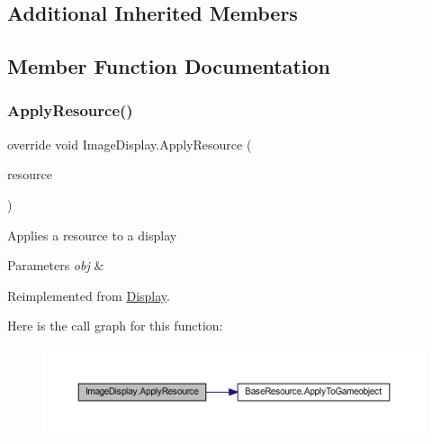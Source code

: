 \subsection*{Additional Inherited Members}


\subsection{Member Function Documentation}
\mbox{\label{class_image_display_ab4cae8c66db7e7d77ab117fe24e63980}} 
\subsubsection{\texorpdfstring{Apply\+Resource()}{ApplyResource()}}
{\footnotesize\ttfamily override void Image\+Display.\+Apply\+Resource (\begin{DoxyParamCaption}\item[{\mbox{\hyperlink{class_base_display_resource}{Base\+Display\+Resource}}}]{resource }\end{DoxyParamCaption})\hspace{0.3cm}{\ttfamily [virtual]}}



Applies a resource to a display 


\begin{DoxyParams}{Parameters}
{\em obj} & \\
\hline
\end{DoxyParams}


Reimplemented from \mbox{\hyperlink{class_display_a811157ddb42ae4d72f690457a08711d3}{Display}}.

Here is the call graph for this function\+:
\nopagebreak
\begin{figure}[H]
\begin{center}
\leavevmode
\includegraphics[width=350pt]{class_image_display_ab4cae8c66db7e7d77ab117fe24e63980_cgraph}
\end{center}
\end{figure}
\mbox{\label{class_image_display_a3dfa32d33641e56a6623265150b8ddba}} 
